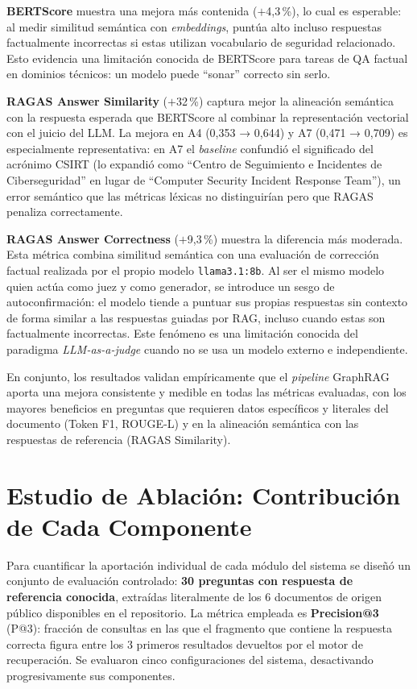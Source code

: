 \textbf{BERTScore} muestra una mejora más contenida ($+$4{,}3\,\%), lo cual es esperable: al medir similitud semántica con \textit{embeddings}, puntúa alto incluso respuestas factualmente incorrectas si estas utilizan vocabulario de seguridad relacionado. Esto evidencia una limitación conocida de BERTScore para tareas de QA factual en dominios técnicos: un modelo puede ``sonar'' correcto sin serlo.

\textbf{RAGAS Answer Similarity} ($+$32\,\%) captura mejor la alineación semántica con la respuesta esperada que BERTScore al combinar la representación vectorial con el juicio del LLM. La mejora en A4 (0{,}353 → 0{,}644) y A7 (0{,}471 → 0{,}709) es especialmente representativa: en A7 el \textit{baseline} confundió el significado del acrónimo CSIRT (lo expandió como ``Centro de Seguimiento e Incidentes de Ciberseguridad'' en lugar de ``Computer Security Incident Response Team''), un error semántico que las métricas léxicas no distinguirían pero que RAGAS penaliza correctamente.

\textbf{RAGAS Answer Correctness} ($+$9{,}3\,\%) muestra la diferencia más moderada. Esta métrica combina similitud semántica con una evaluación de corrección factual realizada por el propio modelo \texttt{llama3.1:8b}. Al ser el mismo modelo quien actúa como juez y como generador, se introduce un sesgo de autoconfirmación: el modelo tiende a puntuar sus propias respuestas sin contexto de forma similar a las respuestas guiadas por RAG, incluso cuando estas son factualmente incorrectas. Este fenómeno es una limitación conocida del paradigma \textit{LLM-as-a-judge} cuando no se usa un modelo externo e independiente.

En conjunto, los resultados validan empíricamente que el \textit{pipeline} GraphRAG aporta una mejora consistente y medible en todas las métricas evaluadas, con los mayores beneficios en preguntas que requieren datos específicos y literales del documento (Token F1, ROUGE-L) y en la alineación semántica con las respuestas de referencia (RAGAS Similarity).

\newpage
\section{Estudio de Ablación: Contribución de Cada Componente}
\label{sec:ablacion}

Para cuantificar la aportación individual de cada módulo del sistema se diseñó un conjunto de evaluación controlado: \textbf{30 preguntas con respuesta de referencia conocida}, extraídas literalmente de los 6 documentos de origen público disponibles en el repositorio. La métrica empleada es \textbf{Precision@3} (P@3): fracción de consultas en las que el fragmento que contiene la respuesta correcta figura entre los 3 primeros resultados devueltos por el motor de recuperación. Se evaluaron cinco configuraciones del sistema, desactivando progresivamente sus componentes.

